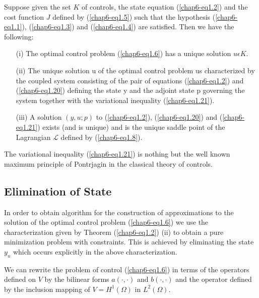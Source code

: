 \begin{theorem}\label{chap6-thm1.2}
Suppose given the set $K$ of controls, the state equation
(\ref{chap6-eq1.2}) and the cost function $J$ defined by
(\ref{chap6-eq1.5}) such that the hypothesis (\ref{chap6-eq1.1}),
(\ref{chap6-eq1.3}) and (\ref{chap6-eq1.4}) are satisfied. Then we
have the following: 
\begin{enumerate}
\item[(i)] The optimal control problem (\ref{chap6-eq1.6}) has a
  unique solution $u \epsilon K$.

\item[(ii)] The unique solution u of the optimal control problem us
  characterized by the coupled system consisting of the pair of
  equations (\ref{chap6-eq1.2}) and (\ref{chap6-eq1.20}) defining the
  state y and the adjoint state p governing the system together with
  the variational inequality (\ref{chap6-eq1.21}).

\item[(iii)] A solution $(y, u ; p)$ to (\ref{chap6-eq1.2}),
  (\ref{chap6-eq1.20}) and (\ref{chap6-eq1.21}) exists (and is unique)
  and is the unique saddle point of the Lagrangian $\mathscr{L}$
  defined by (\ref{chap6-eq1.8}).\pageoriginale 
\end{enumerate}
\end{theorem}

\begin{remark}\label{chap6-rem1.6}
The variational inequality (\ref{chap6-eq1.21}) is nothing but the well known maximum principle of Pontrjagin in the classical theory of controls.
\end{remark}

\subsection{Elimination of State}\label{chap6-subsec1.3}

In order to obtain algorithm for the construction of approximations to
the solution of the optimal control problem (\ref{chap6-eq1.6}) we use
the characterization given by Theorem (\ref{chap6-eq1.2}) (ii) to
obtain a pure minimization problem with constraints. This is achieved
by eliminating the state $y_{u}$ which occurs explicitly in the above
characterization. 

We can rewrite the problem of control (\ref{chap6-eq1.6}) in terms of
the operators defined on $V$ by the bilinear forms $a(\cdot , \cdot)$
and $b(\cdot , \cdot)$ and the operator defined by the inclusion
mapping of $V = H^{1} (\Omega)$ in $L^{2} (\Omega)$. 

